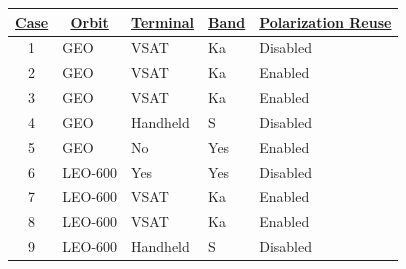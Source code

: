 \begin{table}[]
    \begin{tabular}{cllll}
    \hline
    {\ul \textbf{Case}} & \multicolumn{1}{c}{{\ul \textbf{Orbit}}} & \multicolumn{1}{c}{{\ul \textbf{Terminal}}} & \multicolumn{1}{c}{{\ul \textbf{Band}}} & \multicolumn{1}{c}{{\ul \textbf{Polarization Reuse}}} \\ \hline
    1                   & GEO                                      & VSAT                                        & Ka                                      & Disabled                                              \\ \hline
    2                   & GEO                                      & VSAT                                        & Ka                                      & Enabled                                               \\ \hline
    3                   & GEO                                      & VSAT                                        & Ka                                      & Enabled                                               \\ \hline
    4                   & GEO                                      & Handheld                                    & S                                       & Disabled                                              \\ \hline
    5                   & GEO                                      & No                                          & Yes                                     & Enabled                                               \\ \hline
    6                   & LEO-600                                  & Yes                                         & Yes                                     & Disabled                                              \\ \hline
    7                   & LEO-600                                  & VSAT                                        & Ka                                      & Enabled                                               \\ \hline
    8                   & LEO-600                                  & VSAT                                        & Ka                                      & Enabled                                               \\ \hline
    9                   & LEO-600                                  & Handheld                                    & S                                       & Disabled                                              \\ \hline

\end{tabular}
\end{table}
